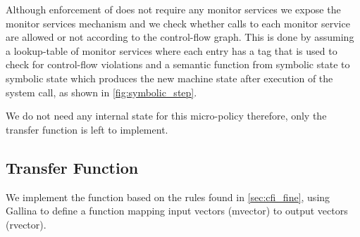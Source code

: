 Although enforcement of \CFI does not require any monitor services we
expose the monitor services mechanism and we check whether calls to
each monitor service are allowed or not according to the control-flow
graph. This is done by assuming a lookup-table of monitor services
where each entry has a tag that is used to check for control-flow
violations and a semantic function from symbolic state to symbolic
state which produces the new machine state after execution of the
system call, as shown in \ref{fig:symbolic_step}.

We do not need any internal state for this micro-policy therefore,
only the transfer function is left to implement.

\subsection{Transfer Function}\label{sec:transfer_fun}

We implement the \TRANSFER function based on the rules found in
\ref{sec:cfi_fine}, using Gallina to define a function mapping
input vectors (mvector) to output vectors (rvector).

